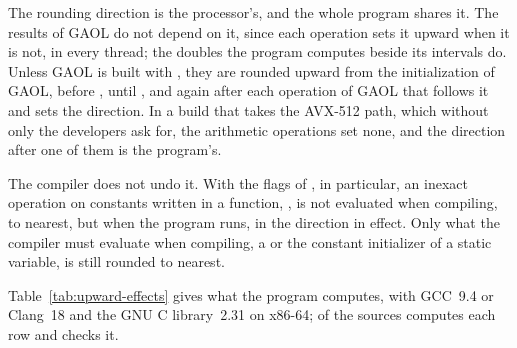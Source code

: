 The rounding direction is the processor's, and the whole program shares it.
The results of GAOL do not depend on it, since each operation sets it upward
when it is not, in every thread; the doubles the program computes beside its
intervals do.\newinvfive{} Unless GAOL is built with
, they are rounded upward from the
initialization of GAOL, before , until , and
again after each operation of GAOL that follows it and sets the direction. In
a build that takes the AVX-512 path, which without
 only the developers ask for, the arithmetic
operations set none, and the direction after one of them is the program's.

\medskip
The compiler does not undo it. With the flags of ,
 in particular, an inexact operation on constants
written in a function, , is not evaluated when compiling, to
nearest, but when the program runs, in the direction in effect. Only what the
compiler must evaluate when compiling, a  or the constant
initializer of a static variable, is still rounded to nearest.

\medskip
Table~\ref{tab:upward-effects} gives what the program computes, with GCC~9.4
or Clang~18 and the GNU C library~2.31 on x86-64;
 of the sources computes each row
and checks it.

